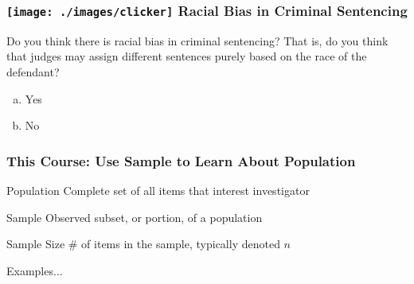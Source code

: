 \documentclass[handout]{beamer}
\begin{document}
%
%

\begin{frame}

\frametitle{\texttt{[image: ./images/clicker]} \hfill  Racial Bias in Criminal Sentencing}

Do you think there is racial bias in criminal sentencing? That is, do you think that judges may assign different sentences purely based on the race of the defendant?

\begin{enumerate}[(a)]
	\item Yes
	\item No
\end{enumerate}

\end{frame}



\begin{frame}
\frametitle{This Course: Use Sample to Learn About Population}


\begin{block}{Population}
Complete set of all items that interest investigator
\end{block}


\begin{block}{Sample}
Observed subset, or portion, of a population
\end{block}

\begin{block}{Sample Size}
\# of items in the sample, typically denoted $n$
\end{block}


\begin{block}{\hfill Examples...}\end{block}

\end{frame}
\end{document}
